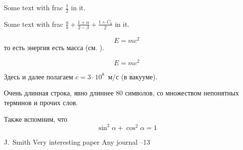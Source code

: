 \documentclass{article}
\begin{document}
Some text with frac $\frac{1}{2}$ in it.%

Some text with frac $\frac{a}{b}+\frac{1+\alpha}{2-\beta}+\frac{1+C_0}{2}$ in it.  %



\begin{equation}\label{eq1}
E=mc^2
\end{equation}
то есть энергия есть масса (см. \cite{Einstein}).

$$E=mc^2$$

Здесь и далее полагаем $c=3\cdot10^8$~м/с (в вакууме).

Очень длинная строка, явно длиннее 80 символов, со множеством непонятных терминов и прочих слов.

Также вспомним, что
\begin{equation*}
\sin^2 \alpha + \cos^2 \alpha = 1
\end{equation*}

\begin{thebibliography}{99}


\by J.~Smith
\paper Very interesting paper
\jour Any journal
--13


\end{thebibliography}
\end{document}
